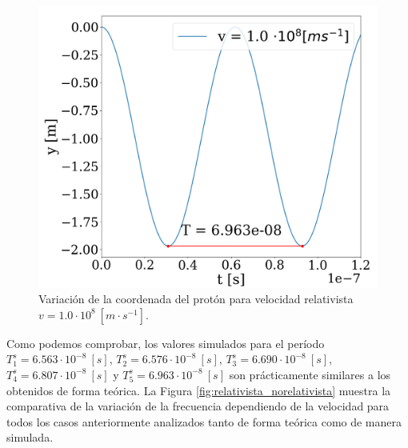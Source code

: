 \documentclass[journal]{IEEEtran}
\begin{document}
\bigskip
\bigskip
\bigskip
\bigskip
\bigskip
\bigskip

\hfill

\begin{figure}[!htb]
    \centering
    \includegraphics[width=\linewidth]{freq_rel_t_4.png}
    \caption{Variación de la coordenada del protón para velocidad relativista $v = 1.0\cdot 10^8~[m\cdot s^{-1}]$.}
    \label{fig:freqrelt4}
\end{figure}

\hfill

\clearpage

Como podemos comprobar, los valores simulados para el período $T^s_1 = 6.563\cdot 10^{-8}~[s]$, $T^s_2 = 6.576\cdot 10^{-8}~[s]$, $T^s_3 = 6.690\cdot 10^{-8}~[s]$, $T^s_4 = 6.807\cdot 10^{-8}~[s]$ y $T^s_5 = 6.963\cdot 10^{-8}~[s]$ son prácticamente similares a los obtenidos de forma teórica. La Figura \ref{fig:relativista_norelativista} muestra la comparativa de la variación de la frecuencia dependiendo de la velocidad para todos los casos anteriormente analizados tanto de forma teórica como de manera simulada.
\end{document}
